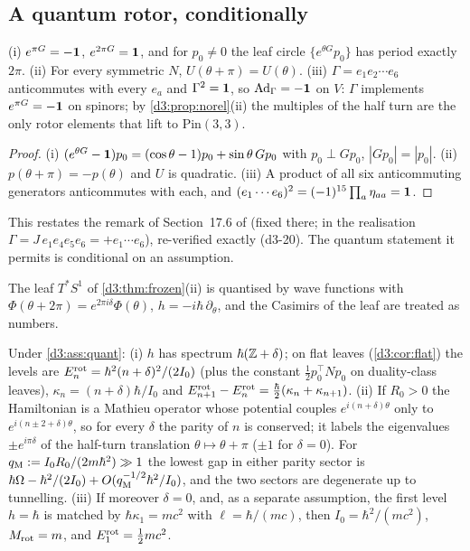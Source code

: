 \subsection{A quantum rotor, conditionally}
\label{d3:sec:quantum}

\begin{proposition}
\label{d3:prop:halfturn}
(i) $e^{\pi G}=-\mathbf 1$, $e^{2\pi G}=\mathbf 1$, and for $p_0\neq0$ the leaf circle $\{e^{\theta G}p_0\}$ has period exactly $2\pi$. (ii) For every symmetric $N$,
$U(\theta+\pi)=U(\theta)$. (iii) $\Gamma=e_1e_2\cdots e_6$ anticommutes with every $e_a$ and $\Gamma^2=\mathbf 1$, so $\operatorname{Ad}_\Gamma=-\mathbf 1$ on $V$: $\Gamma$ implements
$e^{\pi G}=-\mathbf 1$ on spinors; by \cref{d3:prop:norel}(ii) the multiples of the half turn are the only rotor elements that lift to $\mathrm{Pin}(3,3)$.
\end{proposition}

\begin{proof}
(i) $(e^{\theta G}-\mathbf 1)p_0=(\cos\theta-1)p_0+\sin\theta\,Gp_0$ with $p_0\perp Gp_0$, $|Gp_0|=|p_0|$. (ii) $p(\theta+\pi)=-p(\theta)$ and $U$ is quadratic.
(iii) A product of all six anticommuting generators anticommutes with each, and $(e_1\cdots e_6)^2=(-1)^{15}\prod_a\eta_{aa}=\mathbf 1$.
\end{proof}

This restates the remark of Section~17.6 of \cite{ES17} (fixed there; in the realisation $\Gamma=J\,e_1e_4e_5e_6=+e_1\cdots e_6$), re-verified exactly
(d3-20). The quantum statement it permits is conditional on an assumption.

\begin{assumption}
\label{d3:ass:quant}
The leaf $T^*S^1$ of \cref{d3:thm:frozen}(ii) is quantised by wave functions with $\Phi(\theta+2\pi)=e^{2\pi i\delta}\Phi(\theta)$, $h=-i\hbar\,\partial_\theta$,
and the Casimirs of the leaf are treated as numbers.
\end{assumption}

\begin{proposition}
\label{d3:prop:ladder}
Under \cref{d3:ass:quant}: (i) $h$ has spectrum $\hbar(\mathbb{Z}+\delta)$; on flat leaves (\cref{d3:cor:flat}) the levels are
$E^{\rm rot}_n=\hbar^2(n+\delta)^2/(2I_0)$ (plus the constant $\tfrac12p_0^{\!\top}Np_0$ on duality-class leaves), $\kappa_n=(n+\delta)\hbar/I_0$ and
$E^{\rm rot}_{n+1}-E^{\rm rot}_n=\tfrac\hbar2(\kappa_n+\kappa_{n+1})$. (ii) If $R_0>0$ the Hamiltonian is a Mathieu operator \cite{Mathieu,DLMF} whose
potential couples $e^{i(n+\delta)\theta}$ only to $e^{i(n\pm2+\delta)\theta}$, so for every $\delta$ the parity of $n$ is conserved; it labels the
eigenvalues $\pm e^{i\pi\delta}$ of the half-turn translation $\theta\mapsto\theta+\pi$ ($\pm1$ for $\delta=0$). For $q_{\rm M}:=I_0R_0/(2m\hbar^2)\gg1$ the
lowest gap in either parity sector is $\hbar\Omega-\hbar^2/(2I_0)+O(q_{\rm M}^{-1/2}\hbar^2/I_0)$, and the two sectors are degenerate up to tunnelling.
(iii) If moreover $\delta=0$, and, as a separate assumption, the first level $h=\hbar$ is matched by $\hbar\kappa_1=mc^2$ with $\ell=\hbar/(mc)$, then
$I_0=\hbar^2/(mc^2)$, $M_{\rm rot}=m$, and $E^{\rm rot}_1=\tfrac12mc^2$.
\end{proposition}

